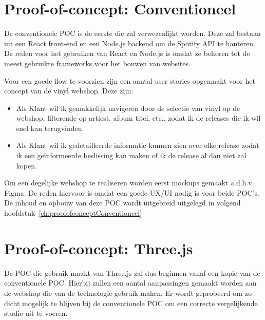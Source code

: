 \pagebreak

\section{Proof-of-concept: Conventioneel}

De conventionele POC is de eerste die zal verwezenlijkt worden. Deze zal bestaan uit een React front-end en een Node.js backend om de Spotify API te hanteren. De reden voor het gebruiken van React en Node.js is omdat ze behoren tot de meest gebruikte frameworks voor het bouwen van websites.

Voor een goede flow te voorzien zijn een aantal user stories opgemaakt voor het concept van de vinyl webshop. Deze zijn:

\begin{itemize}
	\item Als Klant wil ik gemakkelijk navigeren door de selectie van vinyl op de webshop, filterende op artiest, album titel, etc., zodat ik de releases die ik wil snel kan terugvinden.
	\item Als Klant wil ik gedetailleerde informatie kunnen zien over elke release zodat ik een geïnformeerde beslissing kan maken of ik de release al dan niet zal kopen.
\end{itemize}

Om een degelijke webshop te realiseren worden eerst mockups gemaakt a.d.h.v. Figma. De reden hiervoor is omdat een goede UX/UI nodig is voor beide POC's. De inhoud en opbouw van deze POC wordt uitgebreid uitgelegd in volgend hoofdstuk~\ref{ch:proofofconceptConventioneel}

\section{Proof-of-concept: Three.js}

De POC die gebruik maakt van Three.js zal dus beginnen vanaf een kopie van de conventionele POC. Hierbij zullen een aantal aanpassingen gemaakt worden aan de webshop die van de technologie gebruik maken. Er wordt geprobeerd om zo dicht mogelijk te blijven bij de conventionele POC om een correcte vergelijkende studie uit te voeren.
